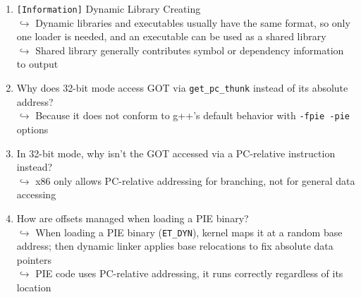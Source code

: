 \documentclass[main.tex]{subfiles}
\begin{document}
\begin{minipage}[t]{0.49\textwidth}
\begin{enumerate}
		$\hookrightarrow$ Static library contributes its code to output
		\item[\texttt{[\_]}] \texttt{[Information]} Dynamic Library Creating\\
		$\hookrightarrow$ Dynamic libraries and executables usually have the same format, so only one loader is needed, and an executable can be used as a shared library\\
		$\hookrightarrow$ Shared library generally contributes symbol or dependency information to output
		\item[\texttt{[0]}] Why does 32-bit mode access GOT via \texttt{get\_pc\_thunk} instead of its absolute address?\\
		$\hookrightarrow$ Because it does not conform to g++'s default behavior with \texttt{-fpie -pie} options
		\item[\texttt{[0]}] In 32-bit mode, why isn't the GOT accessed via a PC-relative instruction instead?\\
		$\hookrightarrow$ x86 only allows PC-relative addressing for branching, not for general data accessing
		\item[\texttt{[2]}] How are offsets managed when loading a PIE binary?\\
		$\hookrightarrow$ When loading a PIE binary (\texttt{ET\_DYN}), kernel maps it at a random base address; then dynamic linker applies base relocations to fix absolute data pointers\\
		$\hookrightarrow$ PIE code uses PC-relative addressing, it runs correctly regardless of its location
	\end{enumerate}
\end{minipage}
\end{document}
